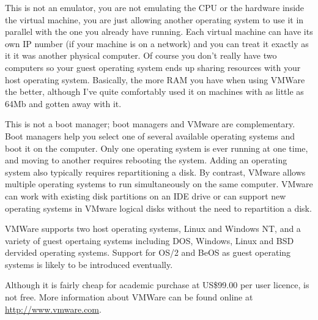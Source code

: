 \documentclass[twoside,11pt]{starlink}
\begin{document}

This is not an emulator, you are not emulating the CPU or the hardware
inside the virtual machine, you are just allowing another operating
system to use it in parallel with the one you already have running.
Each virtual machine can have its own IP number (if your machine is on
a network) and you can treat it exactly as it it was another physical
computer. Of course you don't really have two computers so your guest
operating system ends up sharing resources with your host operating
system. Basically, the more RAM you have when using VMWare the better,
although I've quite comfortably used it on machines with as little as
64Mb and gotten away with it.

This is not a boot manager; boot managers and VMware are
complementary. Boot managers help you select one of several available
operating systems and boot it on the computer.  Only one operating
system is ever running at one time, and moving to another requires
rebooting the system. Adding an operating system also typically
requires repartitioning a disk. By contrast, VMware allows multiple
operating systems to run simultaneously on the same computer. VMware
can work with existing disk partitions on an IDE drive or can support
new operating systems in VMware logical disks without the need to
repartition a disk.



VMWare supports two host operating systems, Linux and Windows NT, and
a variety of guest opertaing systems including DOS, Windows, Linux and
BSD dervided operating systems. Support for OS/2 and BeOS as guest
operating systems is likely to be introduced eventually.

Although it is fairly cheap for academic purchase at US\$99.00 per
user licence,  is
not free. More information about VMWare can be found online at
\url{http://www.vmware.com}.
\end{document}

